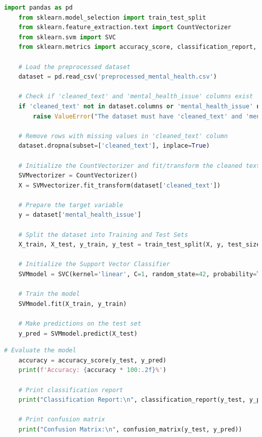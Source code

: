 \begin{tcolorbox}[colback=gray!5!white, colframe=gray!80!black, boxrule=0.5pt, title=Support Vector Classifier Implementation]
    \begin{lstlisting}[language=Python]
    import pandas as pd
    from sklearn.model_selection import train_test_split
    from sklearn.feature_extraction.text import CountVectorizer
    from sklearn.svm import SVC
    from sklearn.metrics import accuracy_score, classification_report, confusion_matrix

    # Load the preprocessed dataset
    dataset = pd.read_csv('preprocessed_mental_health.csv')

    # Check if 'cleaned_text' and 'mental_health_issue' columns exist
    if 'cleaned_text' not in dataset.columns or 'mental_health_issue' not in dataset.columns:
        raise ValueError("The dataset must have 'cleaned_text' and 'mental_health_issue' columns.")

    # Remove rows with missing values in 'cleaned_text' column
    dataset.dropna(subset=['cleaned_text'], inplace=True)

    # Initialize the CountVectorizer and fit/transform the cleaned text
    SVMvectorizer = CountVectorizer()
    X = SVMvectorizer.fit_transform(dataset['cleaned_text'])

    # Prepare the target variable
    y = dataset['mental_health_issue']

    # Split the dataset into Training and Test Sets
    X_train, X_test, y_train, y_test = train_test_split(X, y, test_size=0.2, random_state=42)

    # Initialize the Support Vector Classifier
    SVMmodel = SVC(kernel='linear', C=1, random_state=42, probability=True)  # You can adjust parameters as needed

    # Train the model
    SVMmodel.fit(X_train, y_train)

    # Make predictions on the test set
    y_pred = SVMmodel.predict(X_test)
\end{lstlisting}
\end{tcolorbox}

\begin{tcolorbox}[colback=gray!5!white, colframe=gray!80!black, boxrule=0.5pt, title=Support Vector Classifier Implementation]
    \begin{lstlisting}[language=Python]
    # Evaluate the model
    accuracy = accuracy_score(y_test, y_pred)
    print(f'Accuracy: {accuracy * 100:.2f}%')

    # Print classification report
    print("Classification Report:\n", classification_report(y_test, y_pred))

    # Print confusion matrix
    print("Confusion Matrix:\n", confusion_matrix(y_test, y_pred))
    \end{lstlisting}
\end{tcolorbox}

